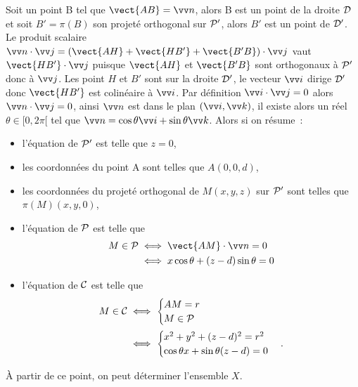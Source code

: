 Soit un point B tel que $\vect{AB}=\vn$, alors B est un point de la droite $\Dr$ et soit $B'=\pi(B)$ son projeté orthogonal sur $\P'$, alors $B'$ est un point de $\Dr'$. Le produit scalaire $\vn\cdot\vj=(\vect{AH}+\vect{HB'}+\vect{B'B})\cdot\vj$ vaut $\vect{HB'}\cdot\vj$ puisque $\vect{AH}$ et $\vect{B'B}$ sont orthogonaux à $\P'$ donc à $\vj$. Les point $H$ et $B'$ sont sur la droite $\Dr'$, le vecteur $\vi$ dirige $\Dr'$ donc $\vect{HB'}$ est colinéaire à $\vi$. Par définition $\vi\cdot \vj=0$ alors $\vn\cdot \vj=0$, ainsi $\vn$ est dans le plan $(\vi,\vk)$, il existe alors un réel $\theta\in[0,2\pi[$ tel que $\vn=\cos\theta\vi+\sin\theta\vk$. Alors si on résume~:
\begin{itemize}
\item l'équation de $\P'$ est telle que $z=0$,
\item les coordonnées du point A sont telles que $A(0,0,d)$,
\item les coordonnées du projeté orthogonal de $M(x,y,z)$ sur $\P'$ sont telles que $\pi(M)(x,y,0)$,
\item l'équation de $\P$ est telle que 
  \begin{align}
    M\in\P &\iff \vect{AM}\cdot\vn=0\\ &\iff x\cos\theta+(z-d)\sin\theta=0
  \end{align}
\item l'équation de $\courbe$ est telle que 
  \begin{align}
    M\in\courbe &\iff \begin{cases} AM=r\\M\in\P \end{cases}\\
    &\iff \begin{cases} x^2+y^2+(z-d)^2=r^2\\ \cos\theta x+\sin\theta (z-d)=0\end{cases}.
  \end{align}
\end{itemize}
À partir de ce point, on peut déterminer l'ensemble $X$.

